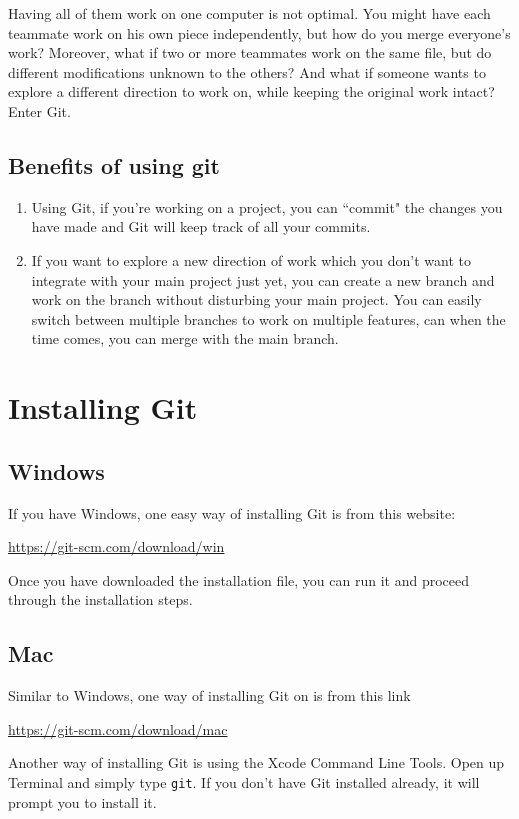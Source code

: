 \documentclass[12pt]{report}
\newcommand\code[1]{{\color{blue}\texttt{#1}}}
\begin{document}
Having all of them work on one computer is not optimal. You might have each teammate work on his own piece independently, but how do you merge everyone's work? Moreover, what if two or more teammates work on the same file, but do different modifications unknown to the others? And what if someone wants to explore a different direction to work on, while keeping the original work intact? Enter Git.

\section{Benefits of using git}
\begin{enumerate}
  \item Using Git, if you're working on a project, you can ``commit" the changes you have made and Git will keep track of all your commits. 
  
  \item If you want to explore a new direction of work which you don't want to integrate with your main project just yet, you can create a new branch and work on the branch without disturbing your main project. You can easily switch between multiple branches to work on multiple features, can when the time comes, you can merge with the main branch. 
\end{enumerate}

\chapter{Installing Git}

\section{Windows}
If you have Windows, one easy way of installing Git is from this website:

\url{https://git-scm.com/download/win}

\noindent
Once you have downloaded the installation file, you can run it and proceed through the installation steps.

\section{Mac}

Similar to Windows, one way of installing Git on is from this link

\url{https://git-scm.com/download/mac}


\noindent
Another way of installing Git is using the Xcode Command Line Tools. Open up Terminal 
and simply type \code{git}. If you don’t have Git installed already, it will prompt you to install it.
\end{document}
